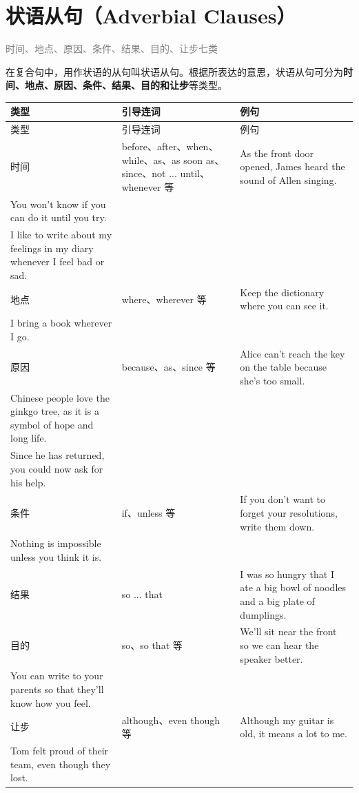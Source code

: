 \documentclass[11pt,a4paper]{ctexart}
\begin{document}
\begin{center}\end{center}

\section{状语从句（Adverbial Clauses）}
\noindent\textcolor{gray}{时间、地点、原因、条件、结果、目的、让步七类}\par\smallskip
在复合句中，用作状语的从句叫状语从句。根据所表达的意思，状语从句可分为\textbf{时间、地点、原因、条件、结果、目的和让步}等类型。

{\footnotesize
\begin{longtable}{p{4.47cm}p{4.47cm}p{4.47cm}}
\hline
类型 & 引导连词 & 例句 \\
\hline
\endfirsthead
\hline
类型 & 引导连词 & 例句 \\
\hline
\endhead
\hline
\endfoot
时间 & before、after、when、while、as、as soon as、since、not ... until、whenever 等 & As the front door opened, James heard the sound of Allen singing.\\ You won’t know if you can do it until you try.\\ I like to write about my feelings in my diary whenever I feel bad or sad. \\
地点 & where、wherever 等 & Keep the dictionary where you can see it.\\ I bring a book wherever I go. \\
原因 & because、as、since 等 & Alice can’t reach the key on the table because she’s too small.\\ Chinese people love the ginkgo tree, as it is a symbol of hope and long life.\\ Since he has returned, you could now ask for his help. \\
条件 & if、unless 等 & If you don’t want to forget your resolutions, write them down.\\ Nothing is impossible unless you think it is. \\
结果 & so ... that & I was so hungry that I ate a big bowl of noodles and a big plate of dumplings. \\
目的 & so、so that 等 & We’ll sit near the front so we can hear the speaker better.\\ You can write to your parents so that they’ll know how you feel. \\
让步 & although、even though 等 & Although my guitar is old, it means a lot to me.\\ Tom felt proud of their team, even though they lost. \\
\end{longtable}
}
\end{document}
